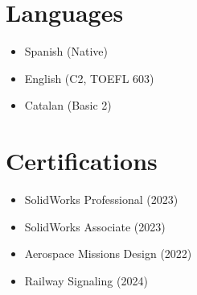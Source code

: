 \documentclass[11pt,a4paper]{article}
\begin{document}
\begin{minipage}[t]{0.3\textwidth}
{{\section*{Languages}
\footnotesize
\begin{itemize}
    \item Spanish (Native)
    \item English (C2, TOEFL 603)
    \item Catalan (Basic 2)
\end{itemize}
\vspace{1em} %

\section*{Certifications}
\footnotesize
\begin{itemize}
    \item SolidWorks Professional (2023)
    \item SolidWorks Associate (2023)
    \item Aerospace Missions Design (2022)
    \item Railway Signaling (2024)
\end{itemize}

\vspace*{5.2em}

\vspace{0.5em} %
}}
\end{minipage}%
\hfill
\end{document}
